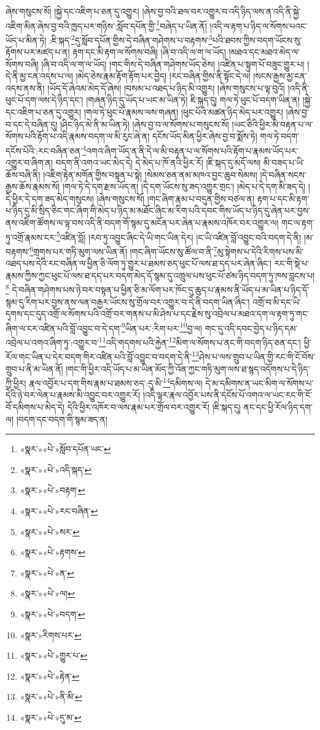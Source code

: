 ཞེས་གསུངས་སོ། །སྐྱེ་དང་འཇིག་པ་ཅན་དུ་འགྱུར། །ཞེས་བྱ་བའི་ཐལ་བར་འགྱུར་བ་འདི་ཉིད་ལས་ན་འདི་ནི་སྐྱེ་འཇིག་མིན་ཞེས་བྱ་བའི་ཁྱད་པར་གཉིས་:སློབ་དཔོན་གྱི་\footnote{«སྣར་»«པེ་»སློབ་དཔོན་ཡང་}བཞེད་པ་ཡིན་ནོ། །འདི་ལ་རྟག་པ་ཉིད་ལ་སོགས་པའང་ཡོད་པ་མིན་ཏེ། :ཇི་སྐད་\footnote{«སྣར་»«པེ་»འདི་སྐད་}དུ་སློབ་དཔོན་གྱིས་དེ་བཞིན་གཤེགས་པ་བརྟགས་\footnote{«སྣར་»«པེ་»བརྟག་}པའི་ཐབས་ཀྱིས་བདག་ཡོངས་སུ་རྟོགས་པར་མཛད་པ་ན། རྟག་དང་མི་རྟག་ལ་སོགས་བཞི། །ཞི་བ་འདི་ལ་ག་ལ་ཡོད། །མཐའ་དང་མཐའ་མེད་ལ་སོགས་བཞི། །ཞི་བ་འདི་ལ་ག་ལ་ཡོད། །གང་གིས་དེ་བཞིན་གཤེགས་ཡོད་ཅེས། །འཛིན་པ་སྟུག་པོ་བཟུང་གྱུར་པ། །དེ་ནི་མྱ་ངན་འདས་པ་ལ། །མེད་ཅེས་རྣམ་རྟོག་རྟོག་པར་བྱེད། །རང་བཞིན་གྱིས་ནི་སྟོང་དེ་ལ། །སངས་རྒྱས་མྱ་ངན་འདས་ནས་ནི། །ཡོད་དོ་ཞེའམ་མེད་དོ་ཞེས། །བསམ་པ་འཐད་པ་ཉིད་མི་འགྱུར། །ཞེས་གསུངས་པ་ལྟ་བུའོ། །འདི་ནི་ཕུང་པོ་དག་ལས་དེ་ཉིད་དང་། །གཞན་ཉིད་དུ་ཡོད་པ་ཡང་མ་ཡིན་ཏེ། ཇི་སྐད་དུ། གལ་ཏེ་ཕུང་པོ་བདག་ཡིན་ན། །སྐྱེ་དང་འཇིག་པ་ཅན་དུ་འགྱུར། །གལ་ཏེ་ཕུང་པོ་རྣམས་ལས་གཞན། །ཕུང་པོའི་མཚན་ཉིད་མེད་པར་འགྱུར། །ཞེས་བྱ་བ་དང་དེ་བཞིན་དུ། །ཤིང་ཉིད་མེ་ནི་མ་ཡིན་ཏེ། །ཞེས་བྱ་བ་ལ་སོགས་པ་གསུངས་སོ། །ཡང་ཅིའི་ཕྱིར་མི་བརྟན་པ་ལ་སོགས་པའི་རྟོག་པ་འདི་རྣམས་བདག་ལ་མི་རུང་ཞེ་ན། དངོས་ཡོད་མིན་ཕྱིར་ཞེས་བྱ་བ་སྨོས་ཏེ། གལ་ཏེ་བདག་དངོས་པོའི་:རང་བཞིན་ཅན་\footnote{«སྣར་»«པེ་»རང་བཞིན་}འགའ་ཞིག་ཡོད་ན་ནི་དེ་ལ་མི་བརྟན་པ་ལ་སོགས་པའི་རྟོག་པ་རྣམས་ཡོད་པར་འགྱུར་བ་ཞིག་ན། བདག་ནི་འགའ་ཡང་མེད་དེ། དེ་མེད་པ་ཁོ་ནའི་ཕྱིར་རོ། །ཇི་སྐད་དུ་མདོ་ལས། མི་བཟད་པ་ཡི་ཆོས་བཞི་ནི། །འཇིག་རྟེན་མགོན་གྱིས་བསྟན་པ་སྟེ། །སེམས་ཅན་ནམ་མཁའ་བྱང་ཆུབ་སེམས། །དེ་བཞིན་སངས་རྒྱས་ཆོས་རྣམས་སོ། །གལ་ཏེ་དེ་དག་རྫས་ཡོད་ན། །དེ་དག་ཡོངས་སུ་ཟད་འགྱུར་གྲང་། །མེད་པ་དེ་དག་མི་ཟད་དེ། །དེ་ཕྱིར་དེ་དག་ཟད་མེད་གསུངས། །ཞེས་གསུངས་སོ། །གང་ཞིག་རྣམ་པ་བདུན་གྱིས་བཙལ་ན། རྟག་པ་དང་མི་རྟག་པ་ཉིད་དུ་མི་སྲིད་ཅིང་གང་ཞིག་གི་མེད་པ་ཉིད་མ་མཐོང་ཞིང་མ་རིག་པའི་དབང་གིས་ཡོད་པ་ཉིད་དུ་ཞེན་པར་བྱས་ནས་འཇིག་ཚོགས་ལ་ལྟ་བས་འདི་ནི་བདག་གོ་སྙམ་དུ་མངོན་པར་ཞེན་པ་རྣམས་འཁོར་བར་འགྱུར་ལ། གང་ལ་རྟག་ཏུ་འགྲོ་རྣམས་ངར་\footnote{«སྣར་»«པེ་»སར་}འཛིན་བློ། །རབ་ཏུ་འབྱུང་ཞིང་དེ་ཡི་གང་ཡིན་དེར། །ང་ཡི་འཛིན་བློ་འབྱུང་བའི་བདག་དེ་ནི། །མ་བརྟགས་\footnote{«སྣར་»«པེ་»རྟགས་}གྲགས་པར་གཏི་མུག་ལས་ཡིན་ནོ། །གང་ཞིག་ཡོངས་སུ་ཚོལ་བ་ནི་\footnote{«སྣར་»«པེ་»ན་}མུ་སྟེགས་པ་དེའི་རིགས་པས་མི་འཐད་པས་དེའི་རང་བཞིན་ལ་ཕྱིན་ཅི་ལོག་ཏུ་གྱུར་པ་ཐམས་ཅད་ཕུང་པོ་ལས་ཐ་དད་པར་ཞེན་ཞིང་། རང་གི་སྡེ་པ་རྣམས་ཀྱིས་ཀྱང་ཕུང་པོ་ལས་ཐ་དད་པར་བདག་མེད་དོ་སྙམ་དུ་འཁྲུལ་པས་ཕུང་པོ་ཙམ་ཉིད་བདག་ཏུ་ཁས་བླངས་པ།\footnote{«སྣར་»«པེ་»ལ།} དེ་བཞིན་གཤེགས་པས་ཉེ་བར་བསྟན་པ་ཕྱིན་ཅི་མ་ལོག་པར་ཁོང་དུ་ཆུད་པ་རྣམས་ནི་ཡོད་པ་མ་ཡིན་པ་ཉིད་དོ་སྙམ་དུ་རིག་པར་བྱས་ནས་ལན་བརྒྱར་ཡོངས་སུ་གྲོལ་བར་འགྱུར་བ་དེ་ནི་བདག་ཡིན་ཞིང་། འགྲོ་བ་མི་དང་ཡི་དྭགས་དང་དུད་འགྲོ་ལ་སོགས་པའི་འགྲོ་བར་གནས་པ་མི་ཤེས་པ་དང་རྗེས་སུ་འབྲེལ་པ་མཐའ་དག་ལ་རྟག་ཏུ་གང་ཞིག་ལ་ངར་འཛིན་པའི་བློ་འབྱུང་བ་དེ་དག་\footnote{«སྣར་»«པེ་»བདག་}ཡིན་པར་:རིག་པར་\footnote{«སྣར་»རིགས་པར་}བྱ་ལ། གང་དུ་འདི་དབང་བྱེད་པ་ཉིད་དམ་འབྲེལ་པ་འགའ་ཞིག་ཏུ་:འགྱུར་བ་\footnote{«སྣར་»«པེ་»གྱུར་པ་}འདི་གདགས་པའི་རྐྱེན་\footnote{«སྣར་»«པེ་»རྟེན་}མིག་ལ་སོགས་པ་ནང་གི་བདག་ཉིད་ཅན་དང་། ཕྱི་རོལ་གང་ཡིན་པ་དེར་བདག་གིར་འཛིན་པའི་བློ་འབྱུང་བ་བདག་དེ་ནི་\footnote{«སྣར་»«པེ་»ནི་མི་}ཤེས་པ་ལས་གྲུབ་པ་ཡིན་གྱི་རང་གི་ངོ་བོས་གྲུབ་པ་ནི་མ་ཡིན་ནོ། །གང་གི་ཕྱིར་འདི་ཡོད་པ་མ་ཡིན་མོད་ཀྱི་འོན་ཀྱང་གཏི་མུག་ལས་ཐ་སྙད་འདོགས་པ་དེ་ཉིད་ཀྱི་ཕྱིར། རྣལ་འབྱོར་པ་དག་གིས་རྣམ་པ་ཐམས་ཅད་:དུ་མི་\footnote{«སྣར་»«པེ་»དུ་མ་}དམིགས་ལ། དེ་མ་དམིགས་ན་ཡང་མིག་ལ་སོགས་པ་དེའི་ཉེ་བར་ལེན་པ་རྣམས་མི་འབྱུང་བར་འགྱུར་རོ། །འདི་ལྟར་རྣལ་འབྱོར་པས་ནི་དངོས་པོ་འགའ་ལ་ཡང་རང་གི་ངོ་བོ་དམིགས་པ་མེད་དེ། དེའི་ཕྱིར་འཁོར་བ་ལས་རྣམ་པར་གྲོལ་བར་འགྱུར་རོ། །ཇི་སྐད་དུ། ནང་དང་ཕྱི་རོལ་ཉིད་དག་ལ། །བདག་དང་བདག་གི་སྙམ་ཟད་ན། 
